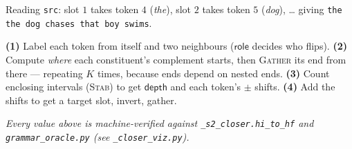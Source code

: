 \documentclass[11pt]{article}
\newcommand{\code}[1]{\texttt{#1}}
\newcommand{\sop}[1]{\ensuremath{\mathsf{#1}}}
\begin{document}
\noindent Reading \code{src}: slot $1$ takes token $4$ (\emph{the}), slot $2$ takes token $5$ (\emph{dog}), \dots
giving \texttt{the the dog chases that boy swims}.

\begin{keybox}
\textbf{(1)} Label each token from itself and two neighbours (\sop{role} decides who flips).
\textbf{(2)} Compute \emph{where} each constituent's complement starts, then \textsc{Gather} its end
from there --- repeating $K$ times, because ends depend on nested ends.
\textbf{(3)} Count enclosing intervals (\textsc{Stab}) to get \sop{depth} and each token's $\pm$ shifts.
\textbf{(4)} Add the shifts to get a target slot, invert, gather.
\end{keybox}

\vfill
\begin{center}\footnotesize\itshape
Every value above is machine-verified against \texttt{\_s2\_closer.hi\_to\_hf} and
\texttt{grammar\_oracle.py} (see \texttt{\_closer\_viz.py}).
\end{center}
\end{document}
